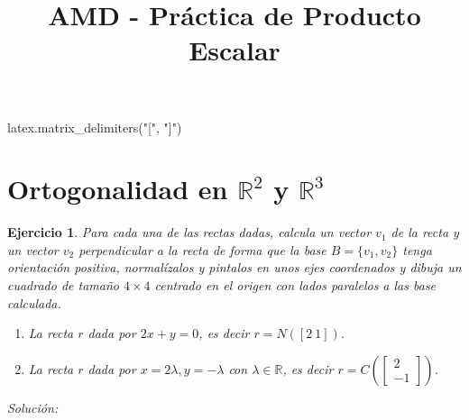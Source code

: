 \documentclass{amsart}
\title{AMD - Práctica de Producto Escalar}
\newtheorem{ejer}{Ejercicio}
\begin{document}
\maketitle

\begin{sagecode}
latex.matrix_delimiters("[", "]")
\end{sagecode}

\section{Ortogonalidad en ${\mathbb R}^2$ y ${\mathbb R}^3$}

\begin{ejer}
Para cada una de las rectas dadas, calcula un vector $v_1$ de la recta y un vector $v_2$ perpendicular
a la recta de forma que la base $B = \{v_1,v_2\}$ tenga orientación positiva, normalízalos y pintalos 
en unos ejes coordenados y dibuja un cuadrado de tamaño $4\times 4$ centrado en el origen con lados 
paralelos a las base calculada.

\begin{enumerate}
\item La recta $r$ dada por $2x+y = 0$, es decir $r = N([2\ 1])$.
\item La recta $r$ dada por $x = 2\lambda, y = -\lambda$ con $\lambda \in {\mathbb R}$, es decir
$r = C\left(\left[\begin{array}{c} 2 \\ -1 \end{array} \right]\right)$.
\end{enumerate}

\end{ejer}

{\it Solución:}

\end{document}
